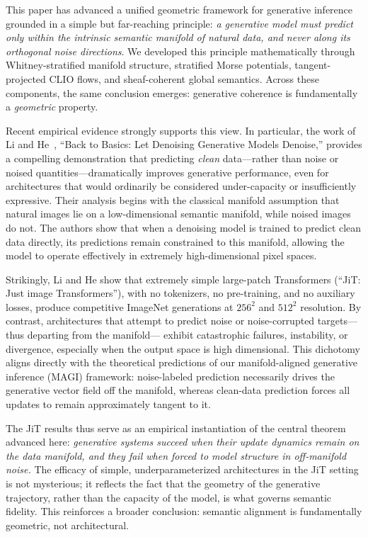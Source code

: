 \documentclass[11pt,a4paper,twocolumn]{article}
\begin{document}
This paper has advanced a unified geometric framework for generative
inference grounded in a simple but far-reaching principle:
\emph{a generative model must predict only within the intrinsic
semantic manifold of natural data, and never along its orthogonal
noise directions}.
We developed this principle mathematically through
Whitney-stratified manifold structure,
stratified Morse potentials,
tangent-projected CLIO flows,
and sheaf-coherent global semantics.
Across these components, the same conclusion emerges:
generative coherence is fundamentally a \emph{geometric} property.

Recent empirical evidence strongly supports this view.
In particular, the work of Li and He~\cite{li2025backtobasics},
``Back to Basics: Let Denoising Generative Models Denoise,'' provides
a compelling demonstration that
predicting \emph{clean} data---rather than noise or
noised quantities---dramatically improves generative performance,
even for architectures that would ordinarily be considered
under-capacity or insufficiently expressive.
Their analysis begins with the classical manifold assumption
that natural images lie on a low-dimensional semantic manifold,
while noised images do not.
The authors show that when a denoising model is trained
to predict clean data directly,
its predictions remain constrained to this manifold,
allowing the model to operate effectively
in extremely high-dimensional pixel spaces.

Strikingly, Li and He show that extremely simple
large-patch Transformers (``JiT: Just image Transformers''),
with no tokenizers, no pre-training, and no auxiliary losses,
produce competitive ImageNet generations at $256^2$ and $512^2$
resolution.
By contrast, architectures that attempt to predict noise
or noise-corrupted targets---thus departing from the manifold---
exhibit catastrophic failures, instability, or divergence,
especially when the output space is high dimensional.
This dichotomy aligns directly with the theoretical predictions
of our manifold-aligned generative inference (MAGI) framework:
noise-labeled prediction necessarily drives the generative vector
field off the manifold, whereas clean-data prediction forces all
updates to remain approximately tangent to it.

The JiT results thus serve as an empirical instantiation
of the central theorem advanced here:
\emph{generative systems succeed when their update dynamics remain on
the data manifold, and they fail when forced to model structure in
off-manifold noise.}
The efficacy of simple, underparameterized architectures in the JiT
setting is not mysterious; it reflects the fact that the geometry of
the generative trajectory, rather than the capacity of the model,
is what governs semantic fidelity.
This reinforces a broader conclusion:
semantic alignment is fundamentally geometric, not architectural.
\end{document}
